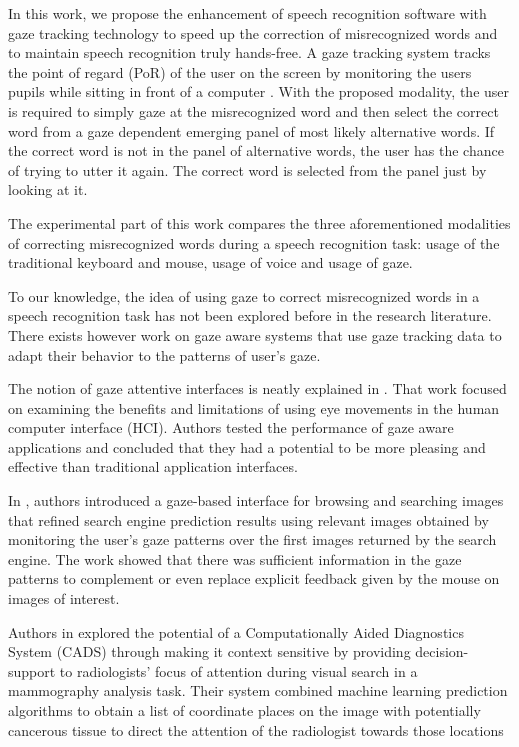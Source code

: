 \documentclass[]{article}
\begin{document}
 
In this work, we propose the enhancement of speech recognition software with gaze tracking technology to speed up the
correction of misrecognized words and to maintain speech recognition truly hands-free. A gaze tracking system tracks the
point of regard (PoR) of the user on the screen by monitoring the users pupils while sitting in front of a computer
\cite{Rozado2012a}. With the proposed modality, the user is required to simply gaze at the misrecognized word and then
select the correct word from a gaze dependent emerging panel of most likely alternative words. If the correct
word is not in the panel of alternative words, the user has the chance of trying to utter it again. The correct word is
selected from the panel just by looking at it.


The experimental part of this work compares the three aforementioned modalities of correcting misrecognized words during
 a speech recognition task: usage of the traditional keyboard and mouse, usage of voice and usage of gaze.


To our knowledge, the idea of using gaze to correct misrecognized words in a speech recognition task has not been 
explored before in the research literature. There exists however work on gaze aware systems that use gaze tracking data
to adapt their behavior to the patterns of user's gaze.


The notion of gaze attentive interfaces is neatly explained in \cite{hyrskykari2006eyes}. That work focused on examining
the benefits and limitations of using eye movements in the human computer interface (HCI). Authors tested 
the performance of gaze aware applications and concluded that they had a potential to be more
pleasing and effective than traditional application interfaces.

 
In \cite{Kozma2009}, authors introduced a gaze-based interface for browsing and searching images that refined search
engine prediction results using relevant images obtained by monitoring the user's gaze patterns over the first images
returned by the search engine. The work showed that there was sufficient information in the gaze patterns to complement
or even replace explicit feedback given by the mouse on images of interest.


Authors in \cite{Tourassi2010} explored the potential of a Computationally Aided Diagnostics System (CADS) through
making it context sensitive by providing decision-support to radiologists' focus of attention during visual search
in a mammography analysis task. Their system combined machine learning prediction algorithms to obtain a list of
coordinate places on the image with potentially cancerous tissue to direct the attention of the radiologist towards
those locations
\end{document}
